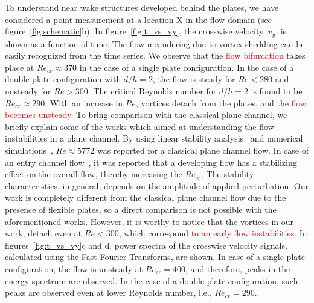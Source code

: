 \documentclass[aps,pre,twocolumn,aps,longbibliography]{revtex4-1}
\begin{document}
	
	To understand near wake structures developed behind the plates, we have considered a point measurement at a location {\normalsize{X}} in the flow domain (see figure~\ref{fig:schematic}b). In figure~\ref{fig:t_vs_vy}, the crosswise velocity, $v_y$, is shown as a function of time. The flow meandering due to vortex shedding can be easily recognized from the time series. We observe that the \textcolor{red}{flow bifurcation} takes place at $Re_{cr}\approx 370$ in the case of a single plate configuration. In the case of a double plate configuration with $d/h=2$, the flow is steady for $Re<280$ and unsteady for $Re>300$. The critical Reynolds number for $d/h=2$ is found to be $Re_{cr}\approx 290$. With an increase in $Re$, vortices detach from the plates, and the \textcolor{red}{flow becomes unsteady.} To bring comparison with the classical plane channel, we briefly explain some of the works which aimed at understanding the flow instabilities in a plane channel. By using linear stability analysis~\citep{orszag_1971} and numerical simulations~\citep{orszag_kells_1980}, $Re\approx 5772$ was reported for a classical plane channel flow. In case of an entry channel flow~\citep{Biau2008}, it was reported that a developing flow has a stabilizing effect on the overall flow, thereby increasing the $Re_{cr}$. The stability characteristics, in general, depends on the amplitude of applied perturbation. Our work is completely different from the classical plane channel flow due to the presence of flexible plates, so a direct comparison is not possible with the aforementioned works. However, it is worthy to notice that the vortices in our work, detach even at $Re<300$, which correspond \textcolor{red}{to an early flow instabilities.} In figures~\ref{fig:t_vs_vy}c and d, power spectra of the crosswise velocity signals, calculated using the Fast Fourier Transforms, are shown. In case of a single plate configuration, the flow is unsteady at $Re_{cr}=400$, and therefore, peaks in the energy spectrum are observed. In the case of a double plate configuration, such peaks are observed even at lower Reynolds number, i.e., $Re_{cr}=290$.
	
	
	
\end{document}
